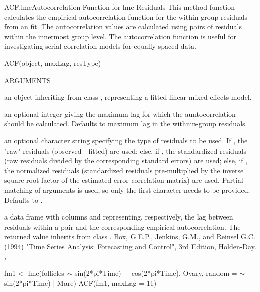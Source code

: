 \documentclass[pdftex]{article} \usepackage{url,graphicx}
\renewcommand{\Twiddle}{\mbox{\(\sim\)}}
\begin{document}
\begin{Helpfile}{ACF.lme}{Autocorrelation Function for lme Residuals}
This method function calculates the empirical autocorrelation function
for the within-group residuals from an  fit. The
autocorrelation values are calculated using pairs of residuals within
the innermost group level. The autocorrelation function is  useful for
investigating serial correlation models for equally spaced data.
\begin{Example}
ACF(object, maxLag, resType)
\end{Example}
\begin{Argument}{ARGUMENTS}
\item[\Co{object:}]
an object inheriting from class , representing
a fitted linear mixed-effects model.
\item[\Co{maxLag:}]
an optional integer giving the maximum lag for which the
auntocorrelation should be calculated. Defaults to maximum lag in the
withnin-group residuals.
\item[\Co{resType:}]
an optional character string specifying the type of
residuals to be used. If , the "raw" residuals
(observed - fitted) are used; else, if , the
standardized residuals (raw residuals divided by the corresponding
standard errors) are used; else, if , the
normalized residuals (standardized residuals pre-multiplied by the
inverse square-root factor of the estimated error correlation
matrix) are used. Partial matching of arguments is used, so only the
first character needs to be provided. Defaults to .
\end{Argument}
a data frame with columns  and  representing,
respectively, the lag between residuals within a pair and the corresponding
empirical autocorrelation. The returned value inherits from class
.
Box, G.E.P., Jenkins, G.M., and Reinsel G.C. (1994) "Time Series
Analysis: Forecasting and Control", 3rd Edition, Holden-Day.
, 
\need 15pt
\vspace{-16pt}
\begin{Example}
fm1 <- lme(follicles {\Twiddle} sin(2*pi*Time) + cos(2*pi*Time), Ovary,
           random = {\Twiddle} sin(2*pi*Time) | Mare)
ACF(fm1, maxLag = 11)
\end{Example}
\end{Helpfile}
\end{document}
